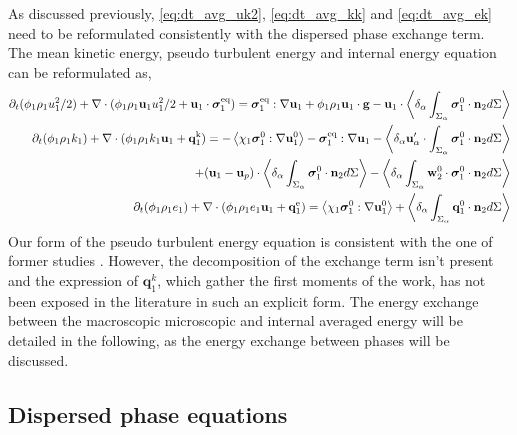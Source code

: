 As discussed previously, \ref{eq:dt_avg_uk2}, \ref{eq:dt_avg_kk} and \ref{eq:dt_avg_ek} need to be reformulated consistently with the dispersed phase exchange term. 
The mean kinetic energy, pseudo turbulent energy and internal energy equation can be reformulated as, 
\begin{align}
    \partial_t (\phi_1 \rho_1u_1^2/2)  
    + \mathbf{\nabla}\cdot (
        \phi_1 \rho_1\textbf{u}_1u_1^2/2
        + \textbf{u}_1 \cdot \bm{\sigma}_1^\text{eq}
    )
    = 
     \bm{\sigma}_1^\text{eq} : \mathbf{\nabla} \textbf{u}_1
    + \phi_1 \rho_1 \textbf{u}_1\cdot \textbf{g} 
    -  \textbf{u}_1\cdot 
        \left<\delta_\alpha \int_{\Sigma_\alpha} {\bm{\sigma}_1^0 \cdot \textbf{n}_2} d\Sigma\right> 
        \\
    \label{eq:dt_hybrid_k1}
    \partial_t (\phi_1\rho_1k_1)  
    + \mathbf{\nabla}\cdot (
        \phi_1\rho_1k_1\textbf{u}_1
        + \textbf{q}_1^\text{k} 
        )
    = 
    - \left<\chi_1\bm{\sigma}_1^0 : \mathbf{\nabla} \textbf{u}_1^0\right>
    - \bm{\sigma}_1^\text{eq} : \mathbf{\nabla} \textbf{u}_1\nonumber
    - \left<\delta_\alpha  \textbf{u}_\alpha' \cdot \int_{\Sigma_\alpha}   \bm{\sigma}_1^0 \cdot \textbf{n}_2 d\Sigma\right>\\
    + (\textbf{u}_1 - \textbf{u}_p)\cdot \left<\delta_\alpha \int_{\Sigma_\alpha} {\bm{\sigma}_1^0 \cdot \textbf{n}_2} d\Sigma\right> 
    - \left<\delta_\alpha  \int_{\Sigma_\alpha} \textbf{w}_2^0 \cdot \bm{\sigma}_1^0 \cdot \textbf{n}_2 d\Sigma\right> 
    \\
    \label{eq:dt_hybrid_e1}
    \partial_t (\phi_1\rho_1e_1)  
    + \mathbf{\nabla}\cdot (
        \phi_1 \rho_1e_1\textbf{u}_1
        +
        \textbf{q}_1^\text{e} 
        )
    = 
    \left<\chi_1\bm{\sigma}_1^0 : \mathbf{\nabla} \textbf{u}_1^0\right>
    + \left<\delta_\alpha \int_{\Sigma_\alpha} {\textbf{q}_1^0 \cdot \textbf{n}_2} d\Sigma\right> 
\end{align}
Our form of the pseudo turbulent energy equation is consistent with the one of former studies \citep[Chapter 7]{morel2015mathematical}\citep[Chapter 2]{scorsim2021particle}\citet{kataoka1989basic}. 
However, the  decomposition of the exchange term isn't present and the expression of $\textbf{q}_1^k$, which gather the first moments of the work, has not been exposed in the literature in such an explicit form.
The energy exchange between the macroscopic microscopic and internal averaged energy will be detailed in the following, as the energy exchange between phases will be discussed.   


\subsection{Dispersed phase equations}

